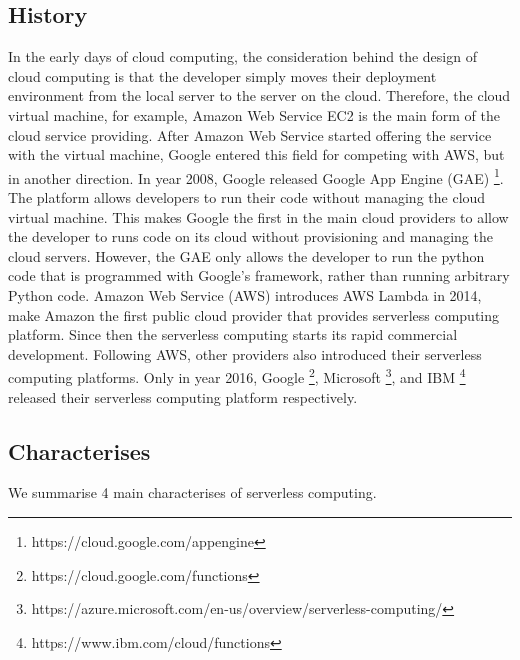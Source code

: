 \subsection{History}
In the early days of cloud computing, the consideration behind the design of cloud computing is that the developer simply moves their deployment environment from the local server to the server on the cloud. Therefore, the cloud virtual machine, for example, Amazon Web Service EC2 is the main form of the cloud service providing. 
After Amazon Web Service started offering the service with the virtual machine, Google entered this field for competing with AWS, but in another direction.
In year 2008, Google released Google App Engine (GAE) \footnote{https://cloud.google.com/appengine}\cite{zahariev2009google}. The platform allows developers to run their code without managing the cloud virtual machine. This makes Google the first in the main cloud providers to allow the developer to runs code on its cloud without provisioning and managing the cloud servers. However, the GAE only allows the developer to run the python code that is programmed with Google's framework, rather than running arbitrary Python code. 
Amazon Web Service (AWS) introduces AWS Lambda in 2014, make Amazon the first public cloud provider that provides serverless computing platform\cite{Serverle77:online}. Since then the serverless computing starts its rapid commercial development. Following AWS, other providers also introduced their serverless computing platforms. Only in year 2016, Google \footnote{https://cloud.google.com/functions}, Microsoft \footnote{https://azure.microsoft.com/en-us/overview/serverless-computing/}, and IBM \footnote{https://www.ibm.com/cloud/functions} released their serverless computing platform respectively.
\subsection{Characterises}
We summarise 4 main characterises of serverless computing. 
